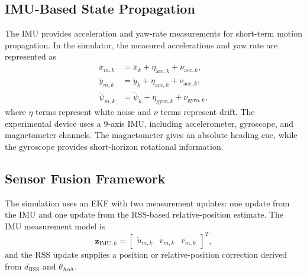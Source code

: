 \documentclass{uhcoethesis}
\begin{document}
\subsection{IMU-Based State Propagation}

The IMU provides acceleration and yaw-rate measurements for short-term motion propagation. In the simulator, the measured accelerations and yaw rate are represented as
\begin{equation}
    \begin{aligned}
    \ddot{x}_{m,k} &= \ddot{x}_k+\eta_{\mathrm{acc},k}+\nu_{\mathrm{acc},k},\\
    \ddot{y}_{m,k} &= \ddot{y}_k+\eta_{\mathrm{acc},k}+\nu_{\mathrm{acc},k},\\
    \dot{\psi}_{m,k} &= \dot{\psi}_k+\eta_{\mathrm{gyro},k}+\nu_{\mathrm{gyro},k},
    \end{aligned}
    \label{eq:ch5_imu_measurement}
\end{equation}
where $\eta$ terms represent white noise and $\nu$ terms represent drift. The experimental device uses a 9-axis IMU, including accelerometer, gyroscope, and magnetometer channels. The magnetometer gives an absolute heading cue, while the gyroscope provides short-horizon rotational information.

\subsection{Sensor Fusion Framework}

The simulation uses an EKF with two measurement updates: one update from the IMU and one update from the RSS-based relative-position estimate. The IMU measurement model is
\begin{equation}
    \mathbf{z}_{\mathrm{IMU},k} =
    \begin{bmatrix}
        \dot{u}_{m,k} & \dot{v}_{m,k} & r_{m,k}
    \end{bmatrix}^{T},
    \label{eq:ch5_imu_vector}
\end{equation}
and the RSS update supplies a position or relative-position correction derived from $d_{\mathrm{RSS}}$ and $\theta_{\mathrm{AoA}}$.
\end{document}
